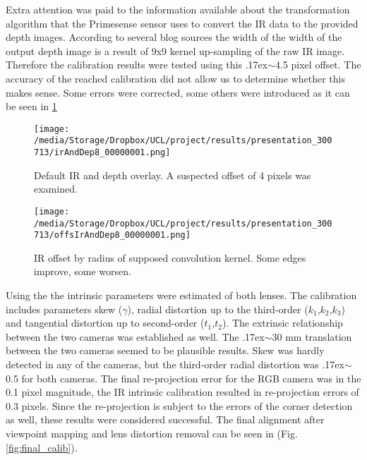 \documentclass{ucl_thesis}
\newcommand{\figref}[1]{(Fig. \ref{#1})}
\newcommand{\mytilde}{\raise.17ex\hbox{$\scriptstyle\mathtt{\sim}$}}
\begin{document}
\par Extra attention was paid to the information available about the transformation algorithm that the Primesense sensor uses to convert the IR data to the provided depth images. According to several blog sources the width of the width of the output depth image is a result of 9x9 kernel up-sampling of the raw IR image. Therefore the calibration results were tested using this \mytilde 4.5 pixel offset. The accuracy of the reached calibration did not allow us to determine whether this makes sense. Some errors were corrected, some others were introduced as it can be seen in \ref{fig:calib_ir_depth}


\begin{figure}[h!]\centering
    \begin{minipage}[b]{0.49\linewidth} \label{fig:ir}
        \texttt{[image: /media/Storage/Dropbox/UCL/project/results/presentation\_300713/irAndDep8\_00000001.png]}
        \caption{Default IR and depth overlay. A suspected offset of 4 pixels was examined.}
    \end{minipage}
    \begin{minipage}[b]{0.49\linewidth}
        \texttt{[image: /media/Storage/Dropbox/UCL/project/results/presentation\_300713/offsIrAndDep8\_00000001.png]}
        \caption{IR offset by radius of supposed convolution kernel. Some edges improve, some worsen.}
    \end{minipage}
    \label{fig:calib_ir_depth}
\end{figure}

\par Using the \citep{calibration_bouguet} the intrinsic parameters were estimated of both lenses. The calibration includes parameters skew ($\gamma$), radial distortion up to the third-order ($k_1$,$k_2$,$k_3$) and tangential distortion up to second-order ($t_1$,$t_2$). The extrinsic relationship between the two cameras was established as well. The \mytilde 30 mm translation between the two cameras seemed to be plausible results. Skew was hardly detected in any of the cameras, but the third-order radial distortion was \mytilde 0.5 for both cameras. The final re-projection error for the RGB camera was in the 0.1 pixel magnitude, the IR intrinsic calibration resulted in re-projection errors of 0.3 pixels. Since the re-projection is subject to the errors of the corner detection as well, these results were considered successful. The final alignment after viewpoint mapping and lens distortion removal can be seen in \figref{fig:final_calib}.
\end{document}
